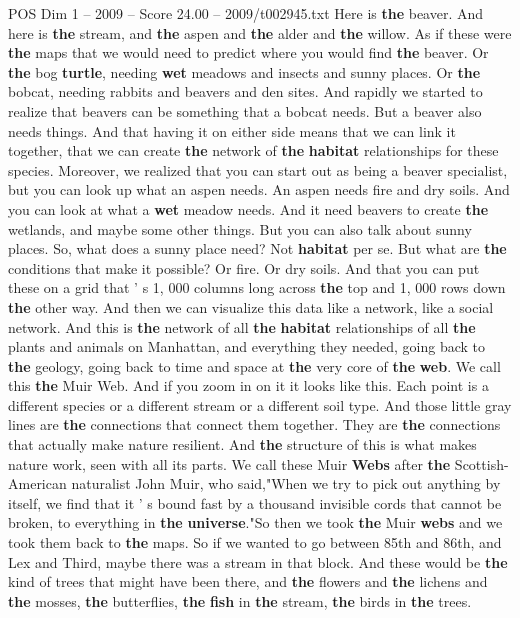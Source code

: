 \begin{textsample}{POS Dim 1 – 2009 – Score 24.00 – 2009/t002945.txt}
Here is \textbf{the} beaver.
And here is \textbf{the} stream, and \textbf{the} aspen and \textbf{the} alder and \textbf{the} willow.
As if these were \textbf{the} maps that we would need to predict where you would find \textbf{the} beaver.
Or \textbf{the} bog \textbf{turtle}, needing \textbf{wet} meadows and insects and sunny places.
Or \textbf{the} bobcat, needing rabbits and beavers and den sites.
And rapidly we started to realize that beavers can be something that a bobcat needs.
But a beaver also needs things.
And that having it on either side means that we can link it together, that we can create \textbf{the} network of \textbf{the} \textbf{habitat} relationships for these species.
Moreover, we realized that you can start out as being a beaver specialist, but you can look up what an aspen needs.
An aspen needs fire and dry soils.
And you can look at what a \textbf{wet} meadow needs.
And it need beavers to create \textbf{the} wetlands, and maybe some other things.
But you can also talk about sunny places.
So, what does a sunny place need?
Not \textbf{habitat} per se.
But what are \textbf{the} conditions that make it possible?
Or fire.
Or dry soils.
And that you can put these on a grid that ' s 1, 000 columns long across \textbf{the} top and 1, 000 rows down \textbf{the} other way.
And then we can visualize this data like a network, like a social network.
And this is \textbf{the} network of all \textbf{the} \textbf{habitat} relationships of all \textbf{the} plants and animals on Manhattan, and everything they needed, going back to \textbf{the} geology, going back to time and space at \textbf{the} very core of \textbf{the} \textbf{web}.
We call this \textbf{the} Muir Web.
And if you zoom in on it it looks like this.
Each point is a different species or a different stream or a different soil type.
And those little gray lines are \textbf{the} connections that connect them together.
They are \textbf{the} connections that actually make nature resilient.
And \textbf{the} structure of this is what makes nature work, seen with all its parts.
We call these Muir \textbf{Webs} after \textbf{the} Scottish-American naturalist John Muir, who said,"When we try to pick out anything by itself, we find that it ' s bound fast by a thousand invisible cords that cannot be broken, to everything in \textbf{the} \textbf{universe}."So then we took \textbf{the} Muir \textbf{webs} and we took them back to \textbf{the} maps.
So if we wanted to go between 85th and 86th, and Lex and Third, maybe there was a stream in that block.
And these would be \textbf{the} kind of trees that might have been there, and \textbf{the} flowers and \textbf{the} lichens and \textbf{the} mosses, \textbf{the} butterflies, \textbf{the} \textbf{fish} in \textbf{the} stream, \textbf{the} birds in \textbf{the} trees.

\end{textsample}
